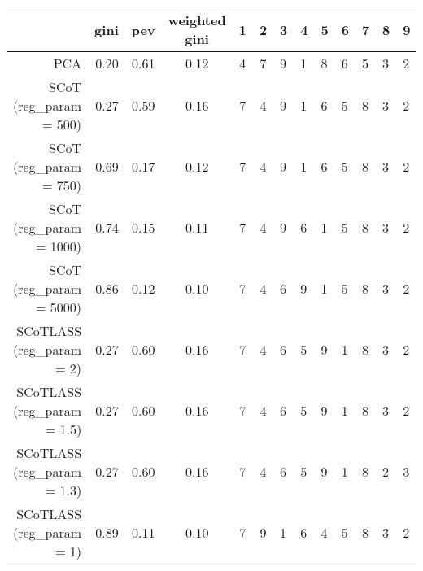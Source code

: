 \begin{tabular}{rr|cccc}
\toprule
{} &  gini &  pev &  weighted gini &  1 &  2 &  3 &  4 &  5 &  6 &  7 &  8 &  9 \\
\midrule
PCA                        &  0.20 & 0.61 &           0.12 &  4 &  7 &  9 &  1 &  8 &  6 &  5 &  3 &  2 \\
SCoT (reg_param = 500)     &  0.27 & 0.59 &           0.16 &  7 &  4 &  9 &  1 &  6 &  5 &  8 &  3 &  2 \\
SCoT (reg_param = 750)     &  0.69 & 0.17 &           0.12 &  7 &  4 &  9 &  1 &  6 &  5 &  8 &  3 &  2 \\
SCoT (reg_param = 1000)    &  0.74 & 0.15 &           0.11 &  7 &  4 &  9 &  6 &  1 &  5 &  8 &  3 &  2 \\
SCoT (reg_param = 5000)    &  0.86 & 0.12 &           0.10 &  7 &  4 &  6 &  9 &  1 &  5 &  8 &  3 &  2 \\
SCoTLASS (reg_param = 2)   &  0.27 & 0.60 &           0.16 &  7 &  4 &  6 &  5 &  9 &  1 &  8 &  3 &  2 \\
SCoTLASS (reg_param = 1.5) &  0.27 & 0.60 &           0.16 &  7 &  4 &  6 &  5 &  9 &  1 &  8 &  3 &  2 \\
SCoTLASS (reg_param = 1.3) &  0.27 & 0.60 &           0.16 &  7 &  4 &  6 &  5 &  9 &  1 &  8 &  2 &  3 \\
SCoTLASS (reg_param = 1)   &  0.89 & 0.11 &           0.10 &  7 &  9 &  1 &  6 &  4 &  5 &  8 &  3 &  2 \\
\bottomrule
\end{tabular}
